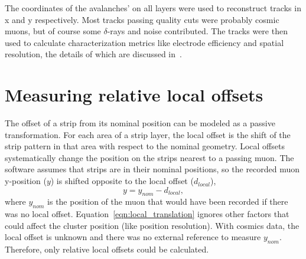 The coordinates of the avalanches' on all layers were used to reconstruct tracks in x and y respectively. Most tracks passing quality cuts were probably cosmic muons, but of course some $\delta$-rays and noise contributed. The tracks were then used to calculate characterization metrics like electrode efficiency and spatial resolution, the details of which are discussed in~\cite{lefebvre_thesis}.



\section{Measuring relative local offsets}

The offset of a strip from its nominal position can be modeled as a passive transformation. For each area of a strip layer, the local offset is the shift of the strip pattern in that area with respect to the nominal geometry.  Local offsets systematically change the position on the strips nearest to a passing muon. The  software assumes that strips are in their nominal positions, so the recorded muon y-position ($y$) is shifted opposite to the local offset ($d_{local}$),
\begin{equation}
    y = y_{nom} - d_{local},
    \label{eqn:local_translation}
\end{equation}
where $y_{nom}$ is the position of the muon that would have been recorded if there was no local offset. Equation~\ref{eqn:local_translation} ignores other factors that could affect the cluster position (like position resolution). With cosmics data, the local offset is unknown and there was no external reference to measure $y_{nom}$. Therefore, only relative local offsets could be calculated. 

